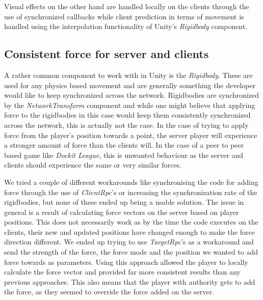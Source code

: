 Visual effects on the other hand are handled locally on the clients through the use of synchronized callbacks while client prediction in terms of movement is handled using the interpolation functionality of Unity's \emph{Rigidbody} component.  

\subsection{Consistent force for server and clients}
\label{sec:conForce}
A rather common component to work with in Unity is the \emph{Rigidbody}. These are used for any physics based movement and are generally something the developer would like to keep synchronized across the network. Rigidbodies are synchronized by the \emph{NetworkTransform} component and while one might believe that applying force to the rigidbodies in this case would keep them consistently synchronized across the network, this is actually not the case. In the case of trying to apply force from the player's position towards a point, the server player will experience a stronger amount of force than the clients will. In the case of a peer to peer based game like \emph{Dockit League}, this is unwanted behaviour as the server and clients should experience the same or very similar forces.

We tried a couple of different workarounds like synchronising the code for adding force through the use of \emph{ClientRpc}'s or increasing the synchronization rate of the rigidbodies, but none of these ended up being a usable solution. The issue in general is a result of calculating force vectors on the server based on player positions. This does not necessarily work as by the time the code executes on the clients, their new and updated positions have changed enough to make the force direction different. We ended up trying to use \emph{TargetRpc}'s as a workaround and send the strength of the force, the force mode and the position we wanted to add force towards as parameters. Using this approach allowed the player to locally calculate the force vector and provided far more consistent results than any previous approaches. This also means that the player with authority gets to add the force, as they seemed to override the force added on the server. 

